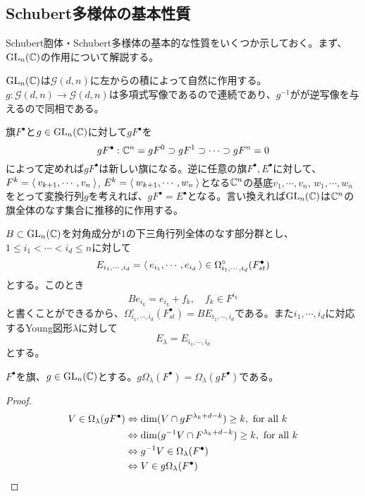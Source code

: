 \documentclass{ltjsreport}
\begin{document}
\subsection{Schubert多様体の基本性質}
Schubert胞体・Schubert多様体の基本的な性質をいくつか示しておく。まず、$\text{GL}_n(\mathbb{C})$の作用について解説する。

$\text{GL}_n(\mathbb{C})$は$\mathcal{G}(d,n)$に左からの積によって自然に作用する。$g:\mathcal{G}(d,n)\rightarrow\mathcal{G}(d,n)$は多項式写像であるので連続であり、$g^{-1}$がが逆写像を与えるので同相である。

旗$F^\bullet$と$g\in\text{GL}_n(\mathbb{C})$に対して$gF^\bullet$を
\[
gF^\bullet:\mathbb{C}^n=gF^0\supset gF^1\supset\cdots\supset gF^n=0
\]
によって定めれば$gF^\bullet$は新しい旗になる。逆に任意の旗$F^\bullet,E^\bullet$に対して、$F^k=\langle\:v_{k+1},\cdots,v_n\:\rangle$, $E^k=\langle\:w_{k+1},\cdots,w_n\:\rangle$となる$\mathbb{C}^n$の基底$v_1,\cdots,v_n$, $w_1,\cdots,w_n$をとって変換行列$g$を考えれば、$gF^\bullet =E^\bullet$となる。言い換えれば$\text{GL}_n(\mathbb{C})$は$\mathbb{C}^n$の旗全体のなす集合に推移的に作用する。

$B\subset\text{GL}_n(\mathbb{C})$を対角成分が$1$の下三角行列全体のなす部分群とし、$1\leq i_1<\cdots<i_d\leq n$に対して
\[
E_{i_1,\cdots,i_d}=\langle\:e_{i_1},\cdots,e_{i_d}\:\rangle\in\Omega_{i_1,\cdots,i_d}^\circ(F^\bullet_{st}) 
\]
とする。このとき
\[
Be_{i_k}=e_{i_k}+f_k,\quad f_k\in F^{i_k}  
\]
と書くことができるから、$\Omega_{i_1,\cdots,i_d}^\circ(F^\bullet_{st})=BE_{i_1,\cdots,i_d}$である。また$i_1,\cdots,i_d$に対応するYoung図形$\lambda$に対して
\[
E_\lambda=E_{i_1,\cdots,i_d}  
\]
とする。

\begin{prop}\label{flag_schubert}
  $F^\bullet$を旗、$g\in\text{GL}_n(\mathbb{C})$とする。$g\Omega_\lambda(F^\bullet)=\Omega_{\lambda}(gF^\bullet)$である。  
\end{prop}

\begin{proof}
  \begin{align*}
    V\in\Omega_\lambda(gF^\bullet)
    &\Leftrightarrow \dim(V\cap gF^{\lambda_k+d-k})\geq k, \text{ for all $k$ }\\
    &\Leftrightarrow \dim(g^{-1}V\cap F^{\lambda_k+d-k})\geq k, \text{ for all $k$}\\
    &\Leftrightarrow g^{-1}V\in \Omega_{\lambda}(F^\bullet)\\
    &\Leftrightarrow V\in g\Omega_{\lambda}(F^\bullet)
  \end{align*}
\end{proof}
\end{document}
